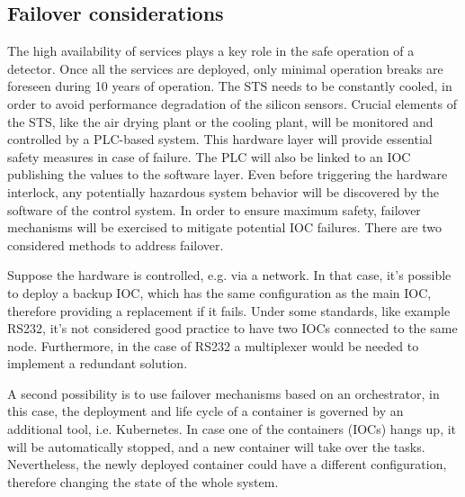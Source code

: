 \subsection{Failover considerations}
The high availability of services plays a key role in the safe operation of a detector. Once all the services are deployed, only minimal operation breaks are foreseen during 10 years of operation. The STS needs to be constantly cooled, in order to avoid performance degradation of the silicon sensors.
Crucial elements of the STS, like the air drying plant or the cooling plant, will be monitored and controlled by a PLC-based system. This hardware layer will provide essential safety measures in case of failure. The PLC will also be linked to an \gls{IOC} publishing the values to the software layer. Even before triggering the hardware interlock, any potentially hazardous system behavior will be discovered by the software of the control system. In order to ensure maximum safety, failover mechanisms will be exercised to mitigate potential \gls{IOC} failures. There are two considered methods to address failover. 

Suppose the hardware is controlled, e.g. via a network. In that case, it's possible to deploy a backup \gls{IOC}, which has the same configuration as the main \gls{IOC}, therefore providing a replacement if it fails. Under some standards, like example RS232, it's not considered good practice to have two \glspl{IOC} connected to the same node. Furthermore, in the case of RS232 a multiplexer would be needed to implement a redundant solution. 

A second possibility is to use failover mechanisms based on an orchestrator, in this case, the deployment and life cycle of a container is governed by an additional tool, i.e. Kubernetes. In case one of the containers (\glspl{IOC}) hangs up, it will be automatically stopped, and a new container will take over the tasks. Nevertheless, the newly deployed container could have a different configuration, therefore changing the state of the whole system. 



